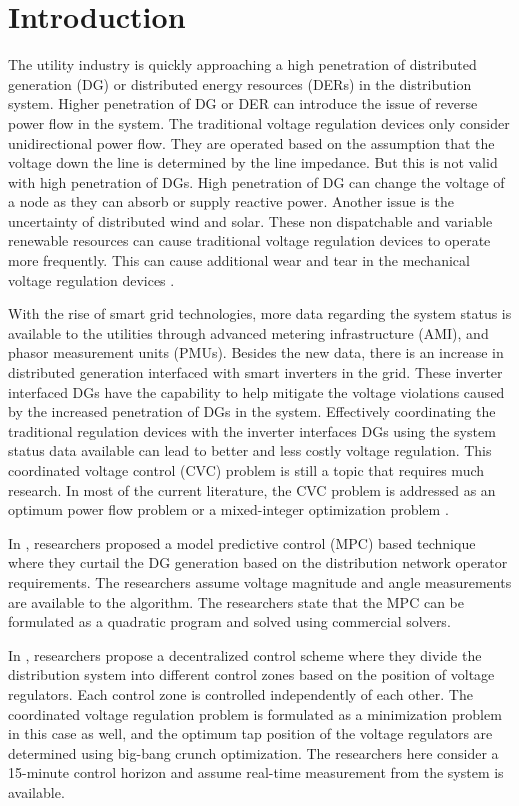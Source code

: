 \documentclass[Journal]{IEEEtran}
\begin{document}
\section{Introduction}
The utility industry is quickly approaching a high penetration of distributed generation (DG) or distributed energy resources (DERs) in the distribution system. Higher penetration of DG  or DER can introduce the issue of reverse power flow in the system. The traditional voltage regulation devices only consider unidirectional power flow. They are operated based on the assumption that the voltage down the line is determined by the line impedance. But this is not valid with high penetration of DGs. High penetration of DG can change the voltage of a node as they can absorb or supply reactive power. Another issue is the uncertainty of distributed wind and solar. These non dispatchable and variable renewable resources can cause traditional voltage regulation devices to operate more frequently. This can cause additional wear and tear in the mechanical voltage regulation devices \cite{int1}.

With the rise of smart grid technologies, more data regarding the system status is available to the utilities through advanced metering infrastructure (AMI), and phasor measurement units (PMUs). Besides the new data, there is an increase in distributed generation interfaced with smart inverters in the grid. These inverter interfaced DGs have the capability to help mitigate the voltage violations caused by the increased penetration of DGs in the system. Effectively coordinating the traditional regulation devices with the inverter interfaces DGs using the system status data available can lead to better and less costly voltage regulation. This coordinated voltage control (CVC) problem is still a topic that requires much research. In most of the current literature, the CVC problem is addressed as an optimum power flow problem or a mixed-integer optimization problem \cite{int2}. 

In \cite{NLR_1}, researchers proposed a model predictive control (MPC) based technique where they curtail the DG generation based on the distribution network operator requirements. The researchers assume voltage magnitude and angle measurements are available to the algorithm. The researchers state that the MPC can be formulated as a quadratic program and solved using commercial solvers.

In \cite{NLR_2}, researchers propose a decentralized control scheme where they divide the distribution system into different control zones based on the position of voltage regulators. Each control zone is controlled independently of each other. The coordinated voltage regulation problem is formulated as a minimization problem in this case as well, and the optimum tap position of the voltage regulators are determined using big-bang crunch optimization. The researchers here consider a 15-minute control horizon and assume real-time measurement from the system is available.
\end{document}
